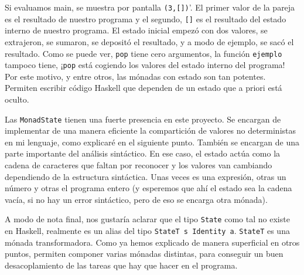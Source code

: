 \documentclass[class=article, crop=false]{standalone}
\begin{document}
Si evaluamos main, se muestra por pantalla \verb`(3,[])`'. El primer valor de la pareja es el
resultado de nuestro programa y el segundo, \verb`[]` es el resultado del estado interno de
nuestro programa. El estado inicial empezó con dos valores, se extrajeron, se sumaron, se
depositó el resultado, y a modo de ejemplo, se sacó el resultado. Como se puede ver,
\verb`pop` tiene cero argumentos, la función \verb`ejemplo` tampoco tiene, ¡\verb`pop` está
cogiendo los valores del estado interno del programa! Por este motivo, y entre otros, las
mónadas con estado son tan potentes. Permiten escribir código Haskell que dependen de un
estado que a priori está oculto.

Las \verb`MonadState` tienen una fuerte presencia en este proyecto. Se encargan de
implementar de una manera eficiente la compartición de valores no deterministas en mi
lenguaje, como explicaré en el siguiente punto. También se encargan de una parte importante
del análisis sintáctico. En ese caso, el estado actúa como la cadena de caracteres que faltan
por reconocer y los valores van cambiando dependiendo de la estructura sintáctica. Unas veces
es una expresión, otras un número y otras el programa entero (y esperemos que ahí el estado
sea la cadena vacía, si no hay un error sintáctico, pero de eso se encarga otra mónada).

A modo de nota final, nos gustaría aclarar que el tipo \verb`State` como tal no existe
en Haskell, realmente es un alias del tipo \verb`StateT s Identity a`. \verb`StateT` es una
mónada transformadora. Como ya hemos explicado de manera superficial en otros puntos,
permiten componer varias mónadas distintas, para conseguir un buen desacoplamiento de las
tareas que hay que hacer en el programa.
\end{document}
